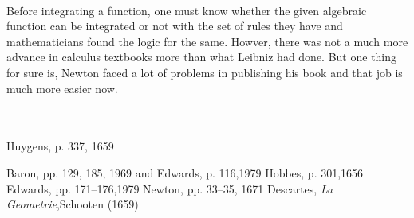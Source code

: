 \documentclass[a4paper,reqno,11pt]{amsart}
\theoremstyle{plain}%
\begin{document}
\\
\indent Before integrating a function, one must know whether the given algebraic function can be integrated or not with the set of rules they have and mathematicians found the logic for the same. Howver, there was not a much more advance in calculus textbooks more than what Leibniz had done. But one thing for sure is, Newton faced a lot of problems in publishing his book and that job is much more easier now.
\\
\\
\\
\begin{thebibliography}{99}
		
		 Huygens, p. 337, 1659
		
		 Baron, pp. 129, 185, 1969 and
Edwards, p. 116,1979
   Hobbes, p. 301,1656
   Edwards, pp. 171–176,1979
   Newton, pp. 33–35, 1671
      Descartes, \textit{La Geometrie},Schooten (1659)
		

		
		
	\end{thebibliography}
	
\end{document}
